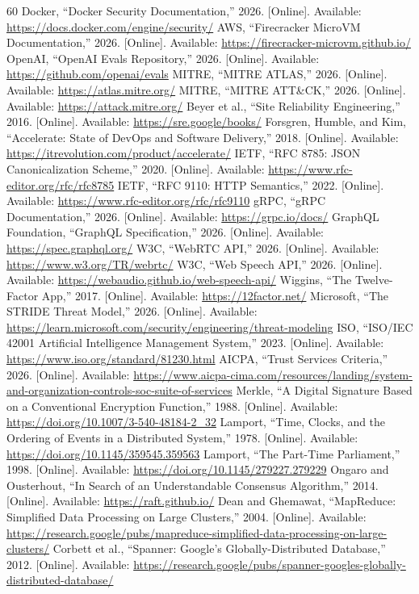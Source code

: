 \documentclass[10pt,journal,onecolumn]{IEEEtran}
\begin{document}
\begin{thebibliography}{60}
 Docker, ``Docker Security Documentation,'' 2026. [Online]. Available: \url{https://docs.docker.com/engine/security/}
 AWS, ``Firecracker MicroVM Documentation,'' 2026. [Online]. Available: \url{https://firecracker-microvm.github.io/}
 OpenAI, ``OpenAI Evals Repository,'' 2026. [Online]. Available: \url{https://github.com/openai/evals}
 MITRE, ``MITRE ATLAS,'' 2026. [Online]. Available: \url{https://atlas.mitre.org/}
 MITRE, ``MITRE ATT\&CK,'' 2026. [Online]. Available: \url{https://attack.mitre.org/}
 Beyer et al., ``Site Reliability Engineering,'' 2016. [Online]. Available: \url{https://sre.google/books/}
 Forsgren, Humble, and Kim, ``Accelerate: State of DevOps and Software Delivery,'' 2018. [Online]. Available: \url{https://itrevolution.com/product/accelerate/}
 IETF, ``RFC 8785: JSON Canonicalization Scheme,'' 2020. [Online]. Available: \url{https://www.rfc-editor.org/rfc/rfc8785}
 IETF, ``RFC 9110: HTTP Semantics,'' 2022. [Online]. Available: \url{https://www.rfc-editor.org/rfc/rfc9110}
 gRPC, ``gRPC Documentation,'' 2026. [Online]. Available: \url{https://grpc.io/docs/}
 GraphQL Foundation, ``GraphQL Specification,'' 2026. [Online]. Available: \url{https://spec.graphql.org/}
 W3C, ``WebRTC API,'' 2026. [Online]. Available: \url{https://www.w3.org/TR/webrtc/}
 W3C, ``Web Speech API,'' 2026. [Online]. Available: \url{https://webaudio.github.io/web-speech-api/}
 Wiggins, ``The Twelve-Factor App,'' 2017. [Online]. Available: \url{https://12factor.net/}
 Microsoft, ``The STRIDE Threat Model,'' 2026. [Online]. Available: \url{https://learn.microsoft.com/security/engineering/threat-modeling}
 ISO, ``ISO/IEC 42001 Artificial Intelligence Management System,'' 2023. [Online]. Available: \url{https://www.iso.org/standard/81230.html}
 AICPA, ``Trust Services Criteria,'' 2026. [Online]. Available: \url{https://www.aicpa-cima.com/resources/landing/system-and-organization-controls-soc-suite-of-services}
 Merkle, ``A Digital Signature Based on a Conventional Encryption Function,'' 1988. [Online]. Available: \url{https://doi.org/10.1007/3-540-48184-2_32}
 Lamport, ``Time, Clocks, and the Ordering of Events in a Distributed System,'' 1978. [Online]. Available: \url{https://doi.org/10.1145/359545.359563}
 Lamport, ``The Part-Time Parliament,'' 1998. [Online]. Available: \url{https://doi.org/10.1145/279227.279229}
 Ongaro and Ousterhout, ``In Search of an Understandable Consensus Algorithm,'' 2014. [Online]. Available: \url{https://raft.github.io/}
 Dean and Ghemawat, ``MapReduce: Simplified Data Processing on Large Clusters,'' 2004. [Online]. Available: \url{https://research.google/pubs/mapreduce-simplified-data-processing-on-large-clusters/}
 Corbett et al., ``Spanner: Google’s Globally-Distributed Database,'' 2012. [Online]. Available: \url{https://research.google/pubs/spanner-googles-globally-distributed-database/}
\end{thebibliography}
\end{document}
